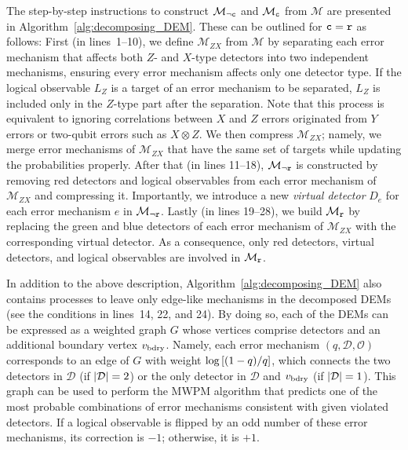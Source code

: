 \documentclass[a4paper,twocolumn,11pt,accepted=2025-01-21]{quantumarticle}
\theoremstyle{definition}
\theoremstyle{definition}
\theoremstyle{definition}
\begin{document}
The step-by-step instructions to construct $\mathcal{M}_{\neg \texttt{c}}$ and $\mathcal{M}_{\texttt{c}}$ from $\mathcal{M}$ are presented in Algorithm~\ref{alg:decomposing_DEM}.
These can be outlined for $\texttt{c}=\texttt{r}$ as follows:
First (in lines~1--10), we define $\mathcal{M}_{ZX}$ from $\mathcal{M}$ by separating each error mechanism that affects both $Z$- and $X$-type detectors into two independent mechanisms, ensuring every error mechanism affects only one detector type.
If the logical observable $L_Z$ is a target of an error mechanism to be separated, $L_Z$ is included only in the $Z$-type part after the separation.
Note that this process is equivalent to ignoring correlations between $X$ and $Z$ errors originated from $Y$ errors or two-qubit errors such as $X \otimes Z$.
We then compress $\mathcal{M}_{ZX}$; namely, we merge error mechanisms of $\mathcal{M}_{ZX}$ that have the same set of targets while updating the probabilities properly.
After that (in lines 11--18), $\mathcal{M}_{\neg \texttt{r}}$ is constructed by removing red detectors and logical observables from each error mechanism of $\mathcal{M}_{ZX}$ and compressing it.
Importantly, we introduce a new \emph{virtual detector} $D_e$ for each error mechanism $e$ in $\mathcal{M}_{\neg \texttt{r}}$.
Lastly (in lines 19--28), we build $\mathcal{M}_{\texttt{r}}$ by replacing the green and blue detectors of each error mechanism of $\mathcal{M}_{ZX}$ with the corresponding virtual detector.
As a consequence, only red detectors, virtual detectors, and logical observables are involved in $\mathcal{M}_{\texttt{r}}$.

In addition to the above description, Algorithm~\ref{alg:decomposing_DEM} also contains processes to leave only edge-like mechanisms in the decomposed DEMs (see the conditions in lines~14, 22, and 24).
By doing so, each of the DEMs can be expressed as a weighted graph $G$ whose vertices comprise detectors and an additional boundary vertex $v_{\mathrm{bdry}}$.
Namely, each error mechanism $(q, \mathcal{D}, \mathcal{O})$ corresponds to an edge of $G$ with weight $\log \qty[(1-q)/q]$, which connects the two detectors in $\mathcal{D}$ (if $\abs{\mathcal{D}} = 2$) or the only detector in $\mathcal{D}$ and $v_{\mathrm{bdry}}$ (if $\abs{\mathcal{D}} = 1$).
This graph can be used to perform the MWPM algorithm that predicts one of the most probable combinations of error mechanisms consistent with given violated detectors.
If a logical observable is flipped by an odd number of these error mechanisms, its correction is $-1$; otherwise, it is $+1$.
\end{document}

